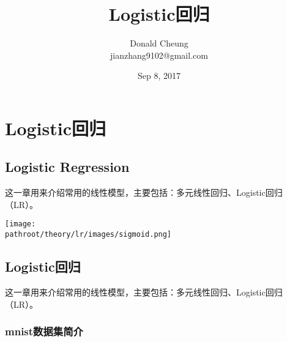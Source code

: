 \documentclass[10pt,a4paper]{ctexbook}
\providecommand{\pathroot}{../..}
\begin{document}
    \setlength{\baselineskip}{20pt}
    \title{Logistic回归}
    \author{Donald Cheung\\jianzhang9102@gmail.com}
    \date{Sep 8, 2017}
    \maketitle
    \tableofcontents
\fi

\chapter{Logistic回归}
\section{Logistic Regression}
这一章用来介绍常用的线性模型，主要包括：多元线性回归、Logistic回归（LR）。

\texttt{[image: \\pathroot/theory/lr/images/sigmoid.png]}

\section{Logistic回归}
这一章用来介绍常用的线性模型，主要包括：多元线性回归、Logistic回归（LR）。

\subsection{mnist数据集简介}
\end{document}
